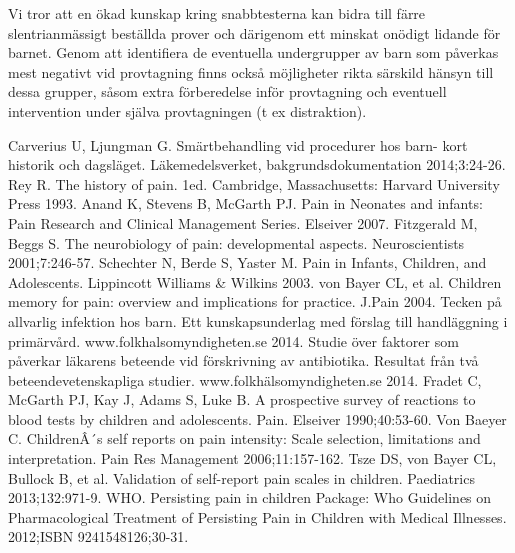 \documentclass[12pt,twocolumn]{article}
\begin{document}
Vi tror att en ökad kunskap kring snabbtesterna kan bidra till färre
slentrianmässigt beställda prover och därigenom ett minskat onödigt lidande för
barnet. Genom att identifiera de eventuella undergrupper av barn som påverkas
mest negativt vid provtagning finns också möjligheter rikta särskild hänsyn till
dessa grupper, såsom extra förberedelse inför provtagning och eventuell
intervention under själva provtagningen (t ex distraktion).




\newpage
\onecolumn

\begin{thebibliography}{1}
 Carverius U, Ljungman G. Smärtbehandling vid procedurer
hos barn- kort historik och dagsläget. Läkemedelsverket, bakgrundsdokumentation 2014;3:24-26. 
 Rey R. The history of pain. 1ed. Cambridge, Massachusetts:
Harvard University Press 1993.
Anand K, Stevens B, McGarth PJ. Pain in Neonates and infants:
Pain Research and Clinical Management Series. Elseiver 2007.
Fitzgerald M, Beggs S. The neurobiology of pain:
developmental aspects. Neuroscientists         2001;7:246-57.
 Schechter N, Berde S, Yaster M. Pain in Infants,
Children, and Adolescents. Lippincott Williams \& Wilkins 2003.
 von Bayer CL, et al. Children memory for pain: overview and implications for practice. J.Pain 2004.
 Tecken på allvarlig infektion hos barn. Ett kunskapsunderlag med förslag till handläggning i primärvård. www.folkhalsomyndigheten.se 2014.
 Studie över faktorer som påverkar läkarens beteende vid förskrivning av antibiotika. Resultat från två beteendevetenskapliga studier. www.folkhälsomyndigheten.se 2014.
 Fradet C, McGarth PJ, Kay J, Adams S, Luke B. A prospective survey of reactions to blood        tests by children and adolescents. Pain. Elseiver 1990;40:53-60.
 Von Baeyer C.    ChildrenÂ´s self reports on pain intensity: Scale selection, limitations and            interpretation. Pain Res Management 2006;11:157-162.
 Tsze DS, von Bayer CL, Bullock B, et al. Validation of self-report pain scales in children.     Paediatrics 2013;132:971-9.
 WHO. Persisting pain in children Package: Who Guidelines on Pharmacological Treatment   of Persisting Pain in Children with Medical Illnesses. 2012;ISBN 9241548126;30-31.

\end{thebibliography}
\end{document}
